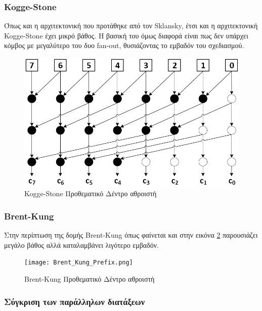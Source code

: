 \clearpage
\subsubsection*{Kogge-Stone}
Όπως και η αρχιτεκτονική που προτάθηκε από τον Sklansky, έτσι και η αρχιτεκτονική
Kogge-Stone \cite{5009159} έχει μικρό βάθος. Η βασική του όμως διαφορά είναι πως δεν υπάρχει 
κόμβος με μεγαλύτερο του δυο fan-out, θυσιάζοντας το εμβαδόν του σχεδιασμού.
\begin{figure}[H]
    \centering
    \includegraphics[scale=0.45]{Pictures/Kogge-Stone.png}
    \caption{Kogge-Stone Προθεματικό Δέντρο αθροιστή}
    \label{Kogge-StoneTree}
\end{figure}






\subsubsection*{Brent-Kung}
Στην περίπτωση της δομής Brent-Kung \cite{Brent:1982:RLP:1309296.1309891}
όπως φαίνεται και στην εικόνα \ref{BrentKungTree} παρουσιάζει μεγάλο βάθος αλλά καταλαμβάνει
λιγότερο εμβαδόν.
\begin{figure}[H]
    \centering
    \texttt{[image: Brent\_Kung\_Prefix.png]}
    \caption{Brent-Kung Προθεματικό Δέντρο αθροιστή}
    \label{BrentKungTree}
\end{figure}




\subsubsection*{Σύγκριση των παράλληλων διατάξεων}

